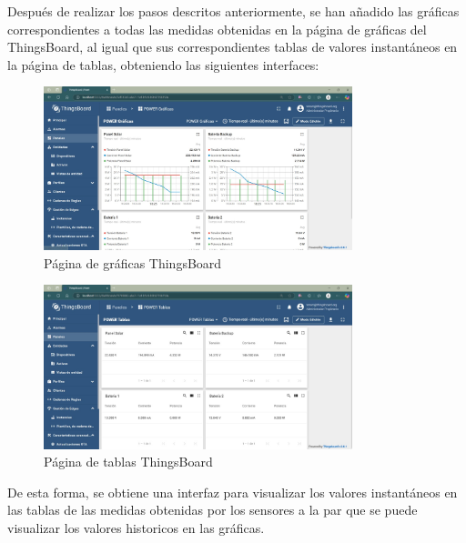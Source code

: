 Después de realizar los pasos descritos anteriormente, se han añadido las gráficas correspondientes a todas las medidas obtenidas en la página de gráficas del ThingsBoard, al igual que sus correspondientes tablas de valores instantáneos en la página de tablas, obteniendo las siguientes interfaces:
\begin{figure}[H]
    \centering
    \includegraphics[width=0.8\textwidth]{images/3-software/3-2-2-thingsboard/PaginaGraficas.jpg}
    \caption{Página de gráficas ThingsBoard}
    \label{fig:3-2-2-PaginaGraficasThingsBoard}
\end{figure}

\begin{figure}[H]
    \centering
    \includegraphics[width=0.8\textwidth]{images/3-software/3-2-2-thingsboard/PaginaTablas.jpg}
    \caption{Página de tablas ThingsBoard}
    \label{fig:3-2-2-PaginaTablasThingsBoard}
\end{figure}

De esta forma, se obtiene una interfaz para visualizar los valores instantáneos en las tablas de las medidas obtenidas por los sensores a la par que se puede visualizar los valores historicos en las gráficas.